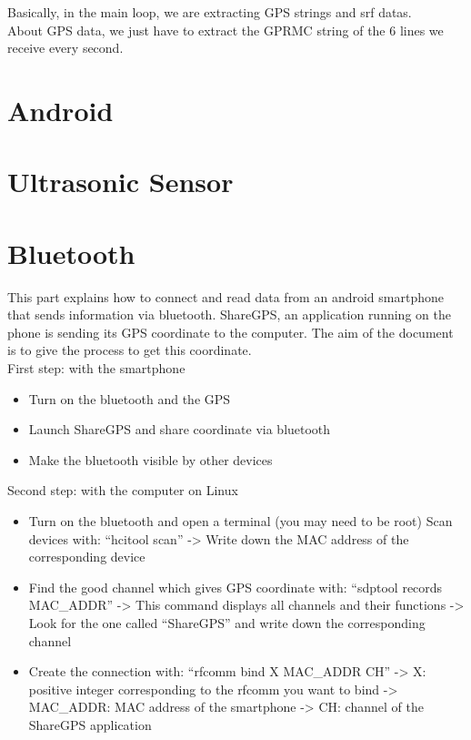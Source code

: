 Basically, in the main loop, we are extracting GPS strings and srf datas.\\

About GPS data, we just have to extract the GPRMC string of the 6 lines we receive every second.

\section{Android}

\section{Ultrasonic Sensor}

\section{Bluetooth}

This part explains how to connect and read data from an android smartphone that sends information via bluetooth. ShareGPS, an application running on the phone is sending its GPS coordinate to the computer. The aim of the document is to give the process to get this coordinate.\\

First step: with the smartphone\\

\begin{itemize}
 \item Turn on the bluetooth and the GPS
 \item Launch ShareGPS and share coordinate via bluetooth
 \item Make the bluetooth visible by other devices
\end{itemize}

Second step: with the computer on Linux\\

\begin{itemize}
   \item  Turn on the bluetooth and open a terminal (you may need to be root)
   Scan devices with: ``hcitool scan''
   -> Write down the MAC address of the corresponding device
   \item Find the good channel which gives GPS coordinate with: ``sdptool records MAC\_ADDR''
   -> This command displays all channels and their functions
   -> Look for the one called ``ShareGPS'' and write down the corresponding channel
   \item Create the connection with: ``rfcomm bind X MAC\_ADDR CH''
    -> X: positive integer corresponding to the rfcomm you want to bind
    -> MAC\_ADDR: MAC address of the smartphone
    -> CH: channel of the ShareGPS application
\end{itemize}

